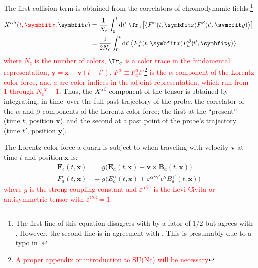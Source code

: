 The first collision term is obtained from the correlators of chromodynamic fields:\footnote{The first line of this equation disagrees with \cite{Carrington:2022bnv} by a fator of $1/2$ but agrees with \cite{Mrowczynski:2017kso}. However, the second line is in agreement with \cite{Carrington:2022bnv}. This is presumably due to a typo in \cite{Carrington:2022bnv}.}
\begin{equation}
	\begin{split}
		X^{\alpha \beta} (\textcolor{red}{t,\mathbf{x}}, \mathbf{v}) & = \frac{1}{N_c} \int_0^t \diff t' ~\Tr_c \left[ \left< F^\alpha(t, \mathbf{x} ) F^\beta(t', \mathbf{y} )\right> \right] \\
		& = \frac{1}{2 N_c} \int_0^t \diff t' \left< F^\alpha_a(t, \mathbf{x} ) F^\beta_a(t', \mathbf{y} )\right>
	\end{split}
	\label{eq:short_X}
\end{equation}
\noindent \textcolor{red}{where $N_c$ is the number of colors, $\Tr_c$ is a color trace in the fundamental representation, $\mathbf{y} = \mathbf{x} - \mathbf{v} (t - t')$, $F^\alpha \equiv F^\alpha_a t^a$\textcolor{red}{\footnote{\textcolor{red}{A proper appendix or introduction to SU(Nc) will be necessary}}} is the $\alpha$ component of the Lorentz color force, and $a$ are color indices in the adjoint representation, which run from 1 through ${N_c}^2 - 1$}. Thus, the $X^{\alpha \beta}$ component of the tensor is obtained by integrating, in time, over the full past trajectory of the probe, the correlator of the $\alpha$ and $\beta$ components of the Lorentz color force; the first at the ``present'' (time $t$, position $\mathbf{x}$), and the second at a past point of the probe's trajectory (time $t'$, position $\mathbf{y}$).

The Lorentz color force a quark is subject to when traveling with velocity $\mathbf{v}$ at time $t$ and position $\mathbf{x}$ is:
\begin{subequations}
	\begin{align}
		\mathbf{F}_a(t, \mathbf{x}) & = g \big( \mathbf{E}_a(t, \mathbf{x}) + \mathbf{v} \times \mathbf{B}_a(t, \mathbf{x}) \big) \\
		F^\alpha_a(t, \mathbf{x}) & = g \big( E^\alpha_a(t, \mathbf{x}) + \varepsilon^{\alpha \gamma \gamma'}{}v^{\gamma} B^{\gamma'}_a(t, \mathbf{x}) \big)
		\label{eq:lorentz_force_component}
	\end{align}
\end{subequations}
\noindent \textcolor{red}{where $g$ is the strong coupling constant and $\varepsilon^{\alpha \beta \gamma}$ is the Levi-Civita or antisymmetric tensor with $\varepsilon^{123}=1$.}

